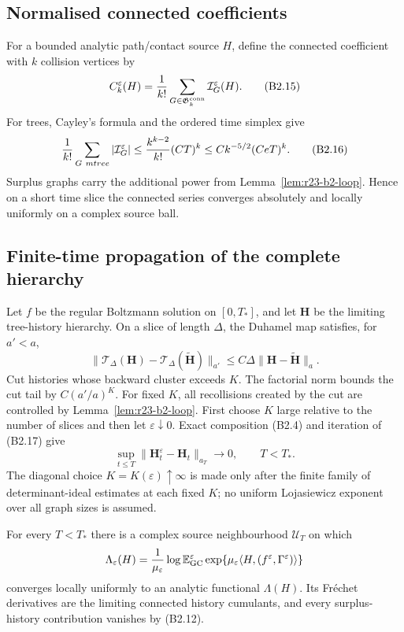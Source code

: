 \subsection{Normalised connected coefficients}

For a bounded analytic path/contact source $H$, define the connected
coefficient with $k$ collision vertices by
\[
 C_k^\varepsilon(H)
 ={1\over k!}\sum_{G\in\mathfrak G_k^{\rm conn}}
   \mathcal I_G^\varepsilon(H).                          \tag{B2.15}
\]
For trees, Cayley's formula and the ordered time simplex give
\[
 {1\over k!}\sum_{G\ {
m tree}}|\mathcal I_G^\varepsilon|
 \le {k^{k-2}\over k!}(CT)^k
 \le Ck^{-5/2}(CeT)^k.                                  \tag{B2.16}
\]
Surplus graphs carry the additional power from
Lemma~\ref{lem:r23-b2-loop}.  Hence on a short time slice the connected
series converges absolutely and locally uniformly on a complex source ball.

\subsection{Finite-time propagation of the complete hierarchy}

Let $f$ be the regular Boltzmann solution on $[0,T_*]$, and let $\mathbf H$
be the limiting tree-history hierarchy.  On a slice of length $\Delta$, the
Duhamel map satisfies, for $a'<a$,
\[
 \|\mathcal T_\Delta(\mathbf H)
       -\mathcal T_\Delta(\widetilde{\mathbf H})\|_{a'}
 \le C\Delta\|\mathbf H-\widetilde{\mathbf H}\|_a .     \tag{B2.17}
\]
Cut histories whose backward cluster exceeds $K$.  The factorial norm bounds
the cut tail by $C(a'/a)^K$.  For fixed $K$, all recollisions created by the
cut are controlled by Lemma~\ref{lem:r23-b2-loop}.  First choose $K$ large
relative to the number of slices and then let $\varepsilon\downarrow0$.  Exact
composition (B2.4) and iteration of (B2.17) give
\[
 \sup_{t\le T}
 \|\mathbf H_t^\varepsilon-\mathbf H_t\|_{a_T}
 \longrightarrow0,\qquad T<T_* .                        \tag{B2.18}
\]
The diagonal choice $K=K(\varepsilon)\uparrow\infty$ is made only after the
finite family of determinant-ideal estimates at each fixed $K$; no uniform
Lojasiewicz exponent over all graph sizes is assumed.

\begin{theorem}
\label{thm:r23-b2-gc-pressure}
For every $T<T_*$ there is a complex source neighbourhood $\mathcal U_T$ on
which
\[
 \Lambda_\varepsilon(H)
 ={1\over\mu_\varepsilon}
 \log\mathbb E_{\rm GC}^\varepsilon
 \exp\{\mu_\varepsilon\langle H,
              (f^\varepsilon,\Gamma^\varepsilon)\rangle\}
\]
converges locally uniformly to an analytic functional $\Lambda(H)$.  Its
Fréchet derivatives are the limiting connected history cumulants, and every
surplus-history contribution vanishes by (B2.12).
\end{theorem}

